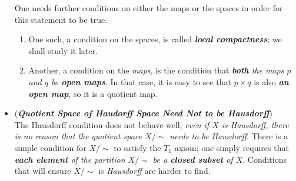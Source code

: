 \documentclass[11pt]{article}
\begin{document}
\begin{itemize}
\begin{remark}
One needs further conditions on either the maps or the spaces in order for this statement to be true. 
\begin{enumerate}
\item One such, a condition on the spaces, is called \emph{\textbf{local compactness}}; we shall study it later. 
\item Another, a condition on the \emph{maps}, is the condition that \emph{\textbf{both} the maps $p$ and $q$ be \textbf{open maps}}. In that case, it is easy to see that $p \times q$ is also \emph{\textbf{an open map}}, so it is a quotient map.
\end{enumerate}
\end{remark}

\item \begin{remark} (\emph{\textbf{Quotient Space of Haudorff Space Need Not to be Hausdorff}})\\
The Hausdorff condition does not behave well; \emph{even if $X$ is Hausdorff, there is no reason that the quotient space $X/\sim$ needs to be Hausdorff}. There is a simple condition for $X/\sim$ to satisfy the $T_1$ axiom; one simply requires that \emph{\textbf{each element} of the partition $X/\sim$ be a \textbf{closed subset} of $X$}. Conditions that will ensure $X/\sim$ is \emph{Hausdorff} are harder to find.
\end{remark}

\end{itemize}
\end{document}
